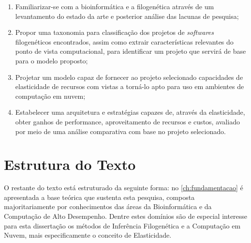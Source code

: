 \documentclass[english,brazilian]{UNISINOSmonografia} %
\begin{document}
\begin{enumerate}[label=Objetivo Específico~\arabic*:~,itemindent=*]
	
	\item Familiarizar-se com a bioinformática e a filogenética através de um levantamento do estado da arte e posterior análise das lacunas de pesquisa;
	
	
	\item Propor uma taxonomia para classificação dos projetos de \textit{softwares} filogenéticos encontrados, assim como extrair características relevantes do ponto de vista computacional, para identificar um projeto que servirá de base para o modelo proposto;
	
	\item Projetar um modelo capaz de fornecer ao projeto selecionado capacidades de elasticidade de recursos com vistas a torná-lo apto para uso em ambientes de computação em nuvem;
	
	\item Estabelecer uma arquitetura e estratégias capazes de, através da elasticidade, obter ganhos de performance, aproveitamento de recursos e custos, avaliado por meio de uma análise comparativa com base no projeto selecionado.
	
	
\end{enumerate}



\section{Estrutura do Texto}


O restante do texto está estruturado da seguinte forma: no \autoref{ch:fundamentacao} é apresentada a base teórica que sustenta esta pesquisa, composta majoritariamente por conhecimentos das áreas da Bioinformática e da Computação de Alto Desempenho. 
Dentre estes domínios são de especial interesse para esta dissertação os métodos de Inferência Filogenética e a Computação em Nuvem, mais especificamente o conceito de Elasticidade.
\end{document}
